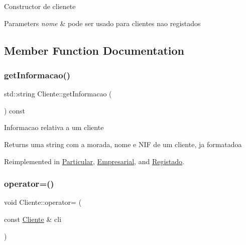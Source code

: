 Constructor de clienete 
\begin{DoxyParams}{Parameters}
{\em nome} & pode ser usado para clientes nao registados \\
\hline
\end{DoxyParams}


\subsection{Member Function Documentation}
\hypertarget{class_cliente_a932ef71b2792dc5df153f82d3e81a6f3}{}\label{class_cliente_a932ef71b2792dc5df153f82d3e81a6f3} 
\subsubsection{\texorpdfstring{get\+Informacao()}{getInformacao()}}
{\footnotesize\ttfamily std\+::string Cliente\+::get\+Informacao (\begin{DoxyParamCaption}{ }\end{DoxyParamCaption}) const\hspace{0.3cm}{\ttfamily [virtual]}}

Informacao relativa a um cliente

\begin{DoxyReturn}{Returns}
uma string com a morada, nome e N\+IF de um cliente, ja formatadoa 
\end{DoxyReturn}


Reimplemented in \hyperlink{class_particular_acde85dcb3d26ca3afe131fb4c35763c8}{Particular}, \hyperlink{class_empresarial_a28090b6b3db16b6b7ba03d6308c2c309}{Empresarial}, and \hyperlink{class_registado_a7017f0d74afd44459c3d6affcb303d52}{Registado}.

\hypertarget{class_cliente_a3aa84b64135b106669724fc08b7cc91f}{}\label{class_cliente_a3aa84b64135b106669724fc08b7cc91f} 
\subsubsection{\texorpdfstring{operator=()}{operator=()}}
{\footnotesize\ttfamily void Cliente\+::operator= (\begin{DoxyParamCaption}\item[{const \hyperlink{class_cliente}{Cliente} \&}]{cli }\end{DoxyParamCaption})}


